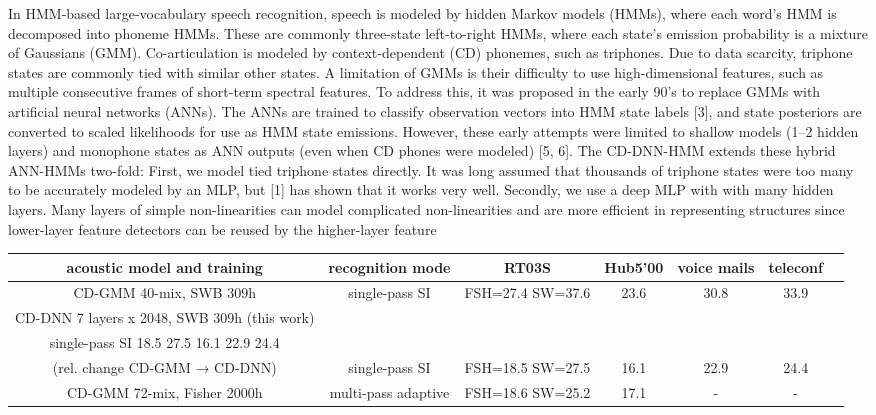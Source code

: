 \documentclass{article}
\begin{document}
In HMM-based large-vocabulary speech recognition,
speech is modeled by hidden Markov models (HMMs),
where each word’s HMM is decomposed into phoneme
HMMs. These are commonly three-state left-to-right
HMMs, where each state’s emission probability is a
mixture of Gaussians (GMM). Co-articulation is modeled by context-dependent (CD) phonemes, such as
triphones. Due to data scarcity, triphone states are
commonly tied with similar other states.
A limitation of GMMs is their difficulty to use high-dimensional features, such as multiple consecutive
frames of short-term spectral features. To address this,
it was proposed in the early 90’s to replace GMMs
with artificial neural networks (ANNs). The ANNs are
trained to classify observation vectors into HMM state
labels [3], and state posteriors are converted to scaled
likelihoods for use as HMM state emissions. However,
these early attempts were limited to shallow models
(1–2 hidden layers) and monophone states as ANN
outputs (even when CD phones were modeled) [5, 6].
The CD-DNN-HMM extends these hybrid ANN-HMMs two-fold: First, we model tied triphone states
directly. It was long assumed that thousands of triphone states were too many to be accurately modeled
by an MLP, but [1] has shown that it works very well.
Secondly, we use a deep MLP with with many hidden layers. Many layers of simple non-linearities can 
model complicated non-linearities and are more efficient in representing structures since lower-layer feature detectors can be reused by the higher-layer feature
\onecolumn
\begin{tabular}{ |c|c|c|c|c|c|c } 
 \hline
 acoustic model and training & recognition mode & RT03S & Hub5’00 & voice mails & teleconf \\ 
 \hline
  \hline
CD-GMM 40-mix, SWB 309h & single-pass SI & FSH=27.4 SW=37.6 & 23.6 & 30.8 & 33.9 \\ 
 \hline
  \hline
 CD-DNN 7 layers x 2048, SWB 309h (this work)\\ single-pass SI 18.5 27.5 16.1 22.9 24.4\\
(rel. change CD-GMM → CD-DNN) & single-pass SI & FSH=18.5 SW=27.5 & 16.1 & 22.9 & 24.4 \\ 
 \hline
  \hline
 CD-GMM 72-mix, Fisher 2000h & multi-pass adaptive &  FSH=18.6 SW=25.2 & 17.1 & - & - \\ 
 \hline
\end{tabular}
\end{document}
